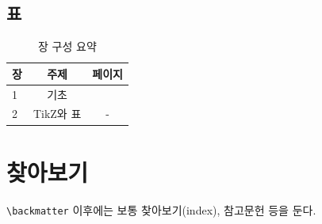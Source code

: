 \documentclass[a4paper,11pt]{book}
\begin{document}
\section{표}
\begin{table}[H]
  \centering
  \begin{tabular}{lcc}
    \toprule
    장 & 주제 & 페이지 \\
    \midrule
    1 & 기초 & \pageref{ch:basics} \\
    2 & TikZ와 표 & - \\
    \bottomrule
  \end{tabular}
  \caption{장 구성 요약}
\end{table}

\backmatter
\chapter{찾아보기}
\verb|\backmatter| 이후에는 보통 찾아보기(index), 참고문헌 등을 둔다.
\end{document}
